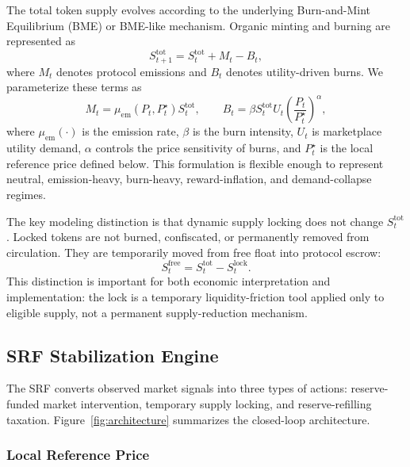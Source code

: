 \documentclass[a4paper,fleqn]{cas-dc}
\begin{document}
The total token supply evolves according to the underlying Burn-and-Mint Equilibrium (BME) or BME-like mechanism. Organic minting and burning are represented as
\begin{equation}
S_{t+1}^{\mathrm{tot}}
=
S_t^{\mathrm{tot}}
+
M_t
-
B_t,
\label{eq:total_supply}
\end{equation}
where $M_t$ denotes protocol emissions and $B_t$ denotes utility-driven burns. We parameterize these terms as
\begin{equation}
M_t = \mu_{\mathrm{em}}(P_t,P_t^{\star})S_t^{\mathrm{tot}},
\qquad
B_t = \beta S_t^{\mathrm{tot}}U_t
\left(
\frac{P_t}{P_t^{\star}}
\right)^{\alpha},
\label{eq:bme_flux}
\end{equation}
where $\mu_{\mathrm{em}}(\cdot)$ is the emission rate, $\beta$ is the burn intensity, $U_t$ is marketplace utility demand, $\alpha$ controls the price sensitivity of burns, and $P_t^{\star}$ is the local reference price defined below. This formulation is flexible enough to represent neutral, emission-heavy, burn-heavy, reward-inflation, and demand-collapse regimes.

The key modeling distinction is that dynamic supply locking does not change $S_t^{\mathrm{tot}}$. Locked tokens are not burned, confiscated, or permanently removed from circulation. They are temporarily moved from free float into protocol escrow:
\begin{equation}
S_t^{\mathrm{free}}
=
S_t^{\mathrm{tot}}
-
S_t^{\mathrm{lock}}.
\label{eq:free_supply}
\end{equation}
This distinction is important for both economic interpretation and implementation: the lock is a temporary liquidity-friction tool applied only to eligible supply, not a permanent supply-reduction mechanism.

\subsection{SRF Stabilization Engine}
\label{subsec:stabilization_engine}

The SRF converts observed market signals into three types of actions: reserve-funded market intervention, temporary supply locking, and reserve-refilling taxation. Figure~\ref{fig:architecture} summarizes the closed-loop architecture.

\subsubsection{Local Reference Price}
\end{document}
